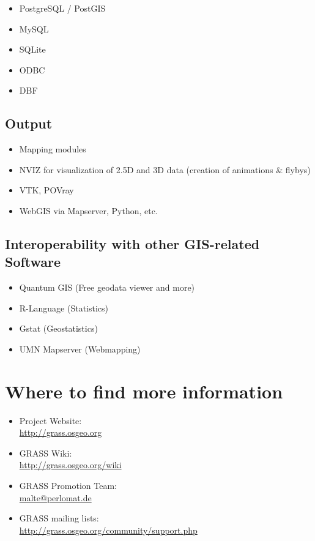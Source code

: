 \documentclass[notumble,a4paper,10pt,nofoldmark]{leaflet}
\newcommand{\GRASSurl}{\url{http://grass.osgeo.org}}
\begin{document}
\begin{itemize}
\item PostgreSQL / PostGIS
\item MySQL
\item SQLite
\item ODBC
\item DBF
\end{itemize}

\subsection{Output}

\begin{itemize}
\item Mapping modules
\item NVIZ for visualization of 2.5D and 3D data (creation of animations \& flybys)
\item VTK, POVray
\item WebGIS via Mapserver, Python, etc.
\end{itemize}

\subsection{Interoperability with other GIS-related Software}

\begin{itemize}
\item Quantum GIS (Free geodata viewer and more)
\item R-Language (Statistics)
\item Gstat (Geostatistics)
\item UMN Mapserver (Webmapping)
\end{itemize}

\section{Where to find more information}

\begin{itemize}
\item{Project Website: \\\GRASSurl}
\item{GRASS Wiki: \\\url{http://grass.osgeo.org/wiki}}
\item{GRASS Promotion Team: \\\url{malte@perlomat.de}}
\item{GRASS mailing lists: \\\url{http://grass.osgeo.org/community/support.php}}
\end{itemize}
\end{document}
